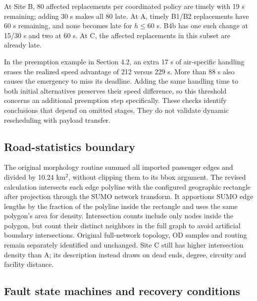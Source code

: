 \documentclass[11pt,a4paper]{article}
\begin{document}


At Site B, 80 affected replacements per coordinated policy are timely with 19 s remaining; adding 30 s makes all 80 late. At A, timely B1/B2 replacements have 60 s remaining, and none becomes late for $h\le60$ s. B4b has one such change at 15/30 s and two at 60 s. At C, the affected replacements in this subset are already late.

In the preemption example in Section 4.2, an extra 17 s of air-specific handling erases the realized speed advantage of 212 versus 229 s. More than 88 s also causes the emergency to miss its deadline. Adding the same handling time to both initial alternatives preserves their speed difference, so this threshold concerns an additional preemption step specifically. These checks identify conclusions that depend on omitted stages. They do not validate dynamic rescheduling with payload transfer.

\subsection{Road-statistics boundary}

The original morphology routine summed all imported passenger edges and divided by 10.24 km$^2$, without clipping them to its bbox argument. The revised calculation intersects each edge polyline with the configured geographic rectangle after projection through the SUMO network transform. It apportions SUMO edge lengths by the fraction of the polyline inside the rectangle and uses the same polygon's area for density. Intersection counts include only nodes inside the polygon, but count their distinct neighbors in the full graph to avoid artificial boundary intersections. Original full-network topology, OD samples and routing remain separately identified and unchanged. Site C still has higher intersection density than A; its description instead draws on dead ends, degree, circuity and facility distance.

\subsection{Fault state machines and recovery conditions}
\end{document}
